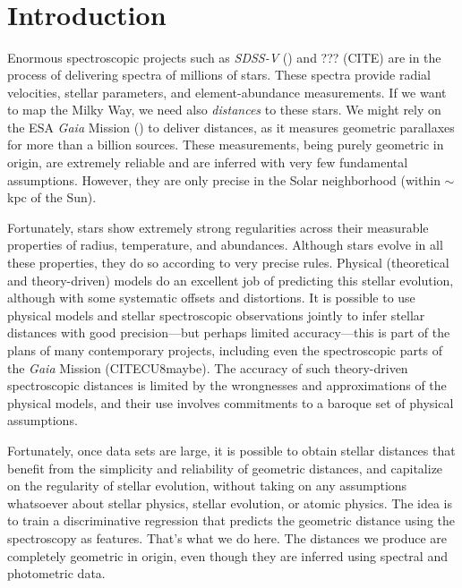 \documentclass[modern]{aastex631}
\newcommand{\acronym}[1]{{\small{#1}}}
\newcommand{\project}[1]{\textsl{#1}}
\newcommand{\Gaia}{\project{Gaia}}
\newcommand{\SDSSV}{\project{\acronym{SDSS-V}}}
\begin{document}

\section*{~}
\clearpage
\section{Introduction}\label{sec:intro}

Enormous spectroscopic projects such as \SDSSV{} (\citealt{sdssv})
and ??? (CITE)
are in the process of delivering spectra of millions of stars.
These spectra provide radial velocities, stellar parameters, and element-abundance
measurements.
If we want to map the Milky Way, we need also \emph{distances} to these stars.
We might rely on the ESA \Gaia{} Mission (\citealt{gaia}) to deliver distances, as it measures
geometric parallaxes for more than a billion sources.
These measurements, being purely geometric in origin, are extremely reliable
and are inferred with very few fundamental assumptions.
However, they are only precise in the Solar neighborhood (within $\sim$kpc of the Sun).

Fortunately, stars show extremely strong regularities across their measurable
properties of radius, temperature, and abundances.
Although stars evolve in all these properties, they do so according to very
precise rules.
Physical (theoretical and theory-driven) models do an excellent job of predicting
this stellar evolution, although with some systematic offsets and distortions.
It is possible to use physical models and stellar spectroscopic observations
jointly to infer stellar distances with good precision---but perhaps limited
accuracy---this is part of the plans of many contemporary projects, including even
the spectroscopic parts of the \Gaia{} Mission (CITECU8maybe).
The accuracy of such theory-driven spectroscopic distances is limited by the
wrongnesses and approximations of the physical models, and their use involves
commitments to a baroque set of physical assumptions.

Fortunately, once data sets are large, it is possible to obtain stellar distances
that benefit from the simplicity and reliability of geometric distances, and
capitalize on the regularity of stellar evolution, without taking on any assumptions
whatsoever about stellar physics, stellar evolution, or atomic physics.
The idea is to train a discriminative regression that predicts the geometric
distance using the spectroscopy as features.
That's what we do here.
The distances we produce are completely geometric in origin, even though they
are inferred using spectral and photometric data.
\end{document}

